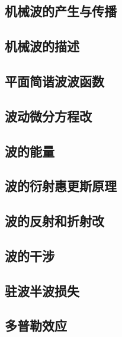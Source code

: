 \documentclass[UTF8]{article}
\begin{document}
\subsection{机械波的产生与传播}
\subsection{机械波的描述}
\subsection{平面简谐波波函数}
\subsection{波动微分方程改}
\subsection{波的能量}
\subsection{波的衍射\;\;惠更斯原理}
\subsection{波的反射和折射改}
\subsection{波的干涉}
\subsection{驻波\;\;半波损失}
\subsection{多普勒效应}
\end{document}
